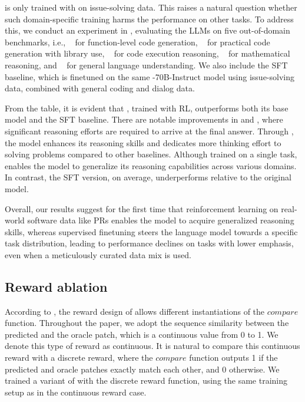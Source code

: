 \ours is only trained with \tech{} on issue-solving data.
This raises a natural question whether such domain-specific training harms the performance on other tasks.
To address this, we conduct an experiment in , evaluating the LLMs on five out-of-domain benchmarks, i.e.,
\humaneval{+}~\cite{codex,liu2023code} for function-level code generation,
\bigcodebench~\cite{bigcodebench} for practical code generation with library use,
\cruxeval~\cite{cruxeval} for code execution reasoning,
\mathbench~\cite{mathbench} for mathematical reasoning,
and \mmlu~\cite{mmlu} for general language understanding.
We also include the SFT baseline, which is finetuned on the same -70B-Instruct model using issue-solving data, combined with general coding and dialog data.

From the table, it is evident that \ours[70], trained with RL, outperforms both its base model and the SFT baseline.
There are notable improvements in \cruxeval and \mathbench, where significant reasoning efforts are required to arrive at the final answer. Through \tech, the model enhances its reasoning skills and dedicates more thinking effort to solving problems compared to other baselines.
Although trained on a single task, \tech{} enables the model to generalize its reasoning capabilities across various domains. In contrast, the SFT version, on average, underperforms relative to the original model.

Overall, our results suggest for the first time that reinforcement learning on real-world software data like PRs enables the model to acquire generalized reasoning skills, whereas supervised finetuning steers the language model towards a specific task distribution, leading to performance declines on tasks with lower emphasis, even when a meticulously curated data mix is used.

\subsection{Reward ablation}
\label{subsec:reward-ablation}

According to , the reward design of \tech allows different instantiations of the $\mathit{compare}$ function.
Throughout the paper, we adopt the sequence similarity between the predicted and the oracle patch, which is a continuous value from 0 to 1.
We denote this type of reward as continuous.
It is natural to compare this continuous reward with a discrete reward, where the
$\mathit{compare}$ function outputs 1 if the predicted and oracle patches exactly match each other, and 0 otherwise.
We trained a variant of \ours with the discrete reward function, using the same training setup as in the continuous reward case.

